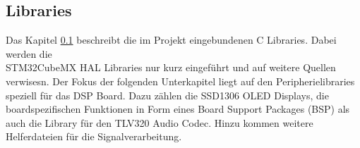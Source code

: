 \subsection{Libraries}
\label{sec:Libraries}

Das Kapitel \ref{sec:Libraries} beschreibt die im Projekt eingebundenen C Libraries.
Dabei werden die \\
STM32CubeMX HAL Libraries nur kurz eingeführt und auf weitere Quellen verwisesn.
Der Fokus der folgenden Unterkapitel liegt auf den Peripherielibraries speziell für das DSP Board. 
Dazu zählen die SSD1306 OLED Displays, die boardspezifischen Funktionen in Form eines Board Support Packages (BSP) als auch die Library für den TLV320 Audio Codec. Hinzu kommen weitere Helferdateien für die Signalverarbeitung.



